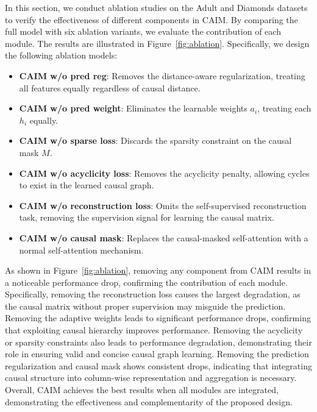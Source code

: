 \documentclass[sigconf, nonacm]{acmart}
\newcommand{\rln}[1]{{\color{black}#1}}
\newcommand{\rlend}[1]{{\color{black}#1}}
\newcommand{\rlx}[1]{\color{black}#1}
\newcommand{\vldb}[1]{{\color{red}#1}}
\newcommand*{\ourmodel}{CAIM}
\begin{document}
\rlend{
In this section, we conduct ablation studies on the Adult and Diamonds datasets to verify the effectiveness of different components in \ourmodel{}. By comparing the full model with six ablation variants, we evaluate the contribution of each module. The results are illustrated in Figure~\ref{fig:ablation}. Specifically, we design the following ablation models: }
\vldb{
\begin{itemize}
    \item \textbf{\ourmodel{} w/o pred reg}: Removes the distance-aware regularization, treating all features equally regardless of causal distance.
    
    \item \textbf{\ourmodel{} w/o pred weight}: Eliminates the learnable weights $a_i$, treating each $h_i$ equally.
    
    \item \textbf{\ourmodel{} w/o sparse loss}: Discards the sparsity constraint on the causal mask $M$.
    
    \item \textbf{\ourmodel{} w/o acyclicity loss}: Removes the acyclicity penalty, allowing cycles to exist in the learned causal graph.
    
    \item \textbf{\ourmodel{} w/o reconstruction loss}: Omits the self-supervised reconstruction task, removing the supervision signal for learning the causal matrix.
    
    \item \textbf{\ourmodel{} w/o causal mask}: Replaces the causal-masked self-attention with a normal self-attention mechanism.
\end{itemize}
}
\rln{
As shown in Figure~\ref{fig:ablation}, removing any component from \ourmodel{} results in a noticeable performance drop, confirming the contribution of each module. 
\rlx{Specifically, removing the reconstruction loss causes the largest degradation, as the causal matrix without proper supervision may misguide the prediction. 
Removing the adaptive weights leads to significant performance drops, confirming that exploiting causal hierarchy improves performance. 
Removing the acyclicity or sparsity constraints also leads to performance degradation, demonstrating their role in ensuring valid and concise causal graph learning. Removing the prediction regularization and causal mask shows consistent drops, indicating that integrating causal structure into column-wise representation and aggregation is necessary.}
}
Overall, \ourmodel{} achieves the best results when all modules are integrated, demonstrating the effectiveness and complementarity of the proposed design.
\end{document}
